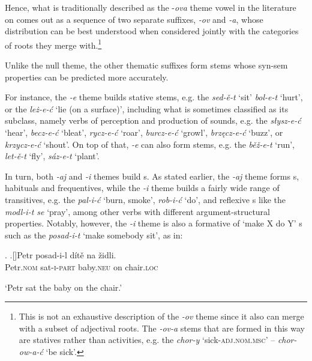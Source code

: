Hence, what is traditionally described as the -\textit{ova} theme vowel in the literature on  comes out as a sequence of two separate suffixes, \textit{-ov} and \textit{-a}, whose distribution can be best understood when considered jointly with the categories of roots they merge with.\footnote{This is not an exhaustive description of the \textit{-ov} theme since it also can merge with a subset of adjectival roots. The \textit{-ov-a}  stems that are formed in this way are statives rather than activities, e.g. the  \textit{chor-y} `sick-\textsc{adj.nom.msc}' -- \textit{chor-ow-a-\'c} `be sick'.
} %
\par 
Unlike the null theme, the other thematic suffixes form  stems whose syn-sem properties can be predicted more accurately. 
\par
 For instance, the \textit{-e} theme builds stative stems, e.g. the  \textit{sed-\v{e}-t} `sit' \textit{bol-e-t} `hurt', or the  \textit{le\.z-e-\'c} `lie (on a surface)', including what is sometimes classified as its subclass, namely verbs of perception and production of sounds, e.g. the  \textit{s\l ysz-e-\'c} `hear', \textit{becz-e-\'c} `bleat', \textit{rycz-e-\'c} `roar', \textit{burcz-e-\'c} `growl', \textit{brz\k{e}cz-e-\'c} `buzz', or \textit{krzycz-e-\'c} `shout'. 
On top of that, \textit{-e} can also form  stems, e.g. the  \textit{b\v{e}\v{z}-e-t} `run', \textit{let-\v{e}-t} `fly', \textit{s\'az-e-t} `plant'.
\par 
In turn, both \textit{-aj} and \textit{-i} themes build  s.  As stated earlier, the \textit{-aj} theme forms s, habituals and frequentives, while the \textit{-i} theme builds a fairly wide range of transitives, e.g. the  \textit{pal-i-\'c} `burn, smoke', \textit{rob-i-\'c} `do', and reflexive s like the  \textit{modl-i-t se} `pray', among other  verbs with different argument-structural  properties. Notably, however, the \textit{-i} theme is also a formative of `make X do Y' s such as the  \textit{posad-i-t} `make somebody sit', as in:

\ex. 
\ag.[]\hspace{-22pt}Petr posad-i-l d\'it\v{e} na \v{z}idli.\\
\hspace{-22pt}Petr.\textsc{nom} sat-\textsc{i-part} baby.\textsc{neu} on chair\textsc{.loc}\\
\hspace{-22pt}\strut `Petr sat the baby on the chair.'

